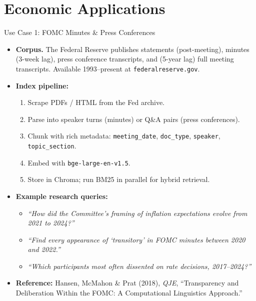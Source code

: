 \documentclass[10pt,english,aspectratio=169]{beamer}
\begin{document}
\section{Economic Applications}

\begin{frame}{Use Case 1: FOMC Minutes \& Press Conferences}
\begin{itemize}
\item \textbf{Corpus.} The Federal Reserve publishes statements (post-meeting), minutes (3-week lag), press conference transcripts, and (5-year lag) full meeting transcripts. Available 1993--present at \texttt{federalreserve.gov}.

\medskip
\item \textbf{Index pipeline:}
\begin{enumerate}
    \item Scrape PDFs / HTML from the Fed archive.
    \item Parse into speaker turns (minutes) or Q\&A pairs (press conferences).
    \item Chunk with rich metadata: \texttt{meeting\_date}, \texttt{doc\_type}, \texttt{speaker}, \texttt{topic\_section}.
    \item Embed with \texttt{bge-large-en-v1.5}.
    \item Store in Chroma; run BM25 in parallel for hybrid retrieval.
\end{enumerate}

\medskip
\item \textbf{Example research queries:}
\begin{itemize}
    \item \emph{``How did the Committee's framing of inflation expectations evolve from 2021 to 2024?''}
    \item \emph{``Find every appearance of `transitory' in FOMC minutes between 2020 and 2022.''}
    \item \emph{``Which participants most often dissented on rate decisions, 2017--2024?''}
\end{itemize}

\medskip
\item \textbf{Reference:} Hansen, McMahon \& Prat (2018), \emph{QJE}, ``Transparency and Deliberation Within the FOMC: A Computational Linguistics Approach.''
\end{itemize}
\end{frame}
\end{document}

